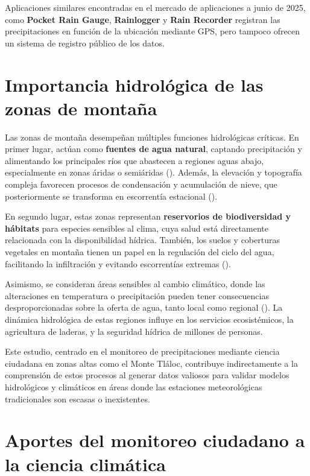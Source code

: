 Aplicaciones similares encontradas en el mercado de aplicaciones a junio de 2025, como \textbf{Pocket Rain Gauge}, \textbf{Rainlogger} y \textbf{Rain Recorder} registran las precipitaciones en función de la ubicación mediante GPS, pero tampoco ofrecen un sistema de registro público de los datos.








\section{Importancia hidrológica de las zonas de montaña}



Las zonas de montaña desempeñan múltiples funciones hidrológicas críticas. En primer lugar, actúan como \textbf{fuentes de agua natural}, captando precipitación y alimentando los principales ríos que abastecen a regiones aguas abajo, especialmente en zonas áridas o semiáridas  (\cite{viviroli2007mountain}). Además, la elevación y topografía compleja favorecen procesos de condensación y acumulación de nieve, que posteriormente se transforma en escorrentía estacional  (\cite{immerzeel2020importance}). 

En segundo lugar, estas zonas representan \textbf{reservorios de biodiversidad y hábitats} para especies sensibles al clima, cuya salud está directamente relacionada con la disponibilidad hídrica. También, los suelos y coberturas vegetales en montaña tienen un papel en la regulación del ciclo del agua, facilitando la infiltración y evitando escorrentías extremas  (\cite{buytaert2011mountain}).

Asimismo, se consideran áreas sensibles al cambio climático, donde las alteraciones en temperatura o precipitación pueden tener consecuencias desproporcionadas sobre la oferta de agua, tanto local como regional  (\cite{beniston2003climatic}). La dinámica hidrológica de estas regiones influye en los servicios ecosistémicos, la agricultura de laderas, y la seguridad hídrica de millones de personas.

Este estudio, centrado en el monitoreo de precipitaciones mediante ciencia ciudadana en zonas altas como el Monte Tláloc, contribuye indirectamente a la comprensión de estos procesos al generar datos valiosos para validar modelos hidrológicos y climáticos en áreas donde las estaciones meteorológicas tradicionales son escasas o inexistentes.


\section{Aportes del monitoreo ciudadano a la ciencia climática}


